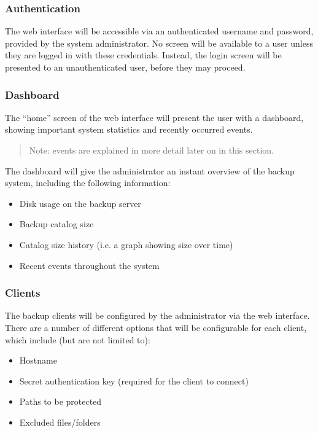 \subsubsection{Authentication}

The web interface will be accessible via an authenticated username and
password, provided by the system administrator. No screen will be available to
a user unless they are logged in with these credentials. Instead, the login
screen will be presented to an unauthenticated user, before they may proceed.

\subsubsection{Dashboard}

The ``home'' screen of the web interface will present the user with
a dashboard, showing important system statistics and recently occurred events.

\begin{quote}
    Note: events are explained in more detail later on in this section.
\end{quote}

The dashboard will give the administrator an instant overview of the backup
system, including the following information:

\begin{itemize}
    \item Disk usage on the backup server
    \item Backup catalog size
    \item Catalog size history (i.e. a graph showing size over time)
    \item Recent events throughout the system
\end{itemize}

\subsubsection{Clients}

The backup clients will be configured by the administrator via the web
interface. There are a number of different options that will be configurable
for each client, which include (but are not limited to):

\begin{itemize}
    \item Hostname
    \item Secret authentication key (required for the client to connect)
    \item Paths to be protected
    \item Excluded files/folders
\end{itemize}


